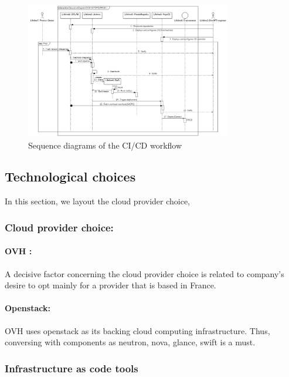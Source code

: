 \begin{figure}[!ht]\centering
\includegraphics[width=0.8\textwidth,angle=00]{assets/f6.jpg}
\caption{Sequence diagrams of the CI/CD workflow}
\label{fig:f6}
\end{figure}


\newpage
\subsection{Technological choices }
In this section, we layout the cloud provider choice,
\subsubsection{Cloud provider choice: } 

\paragraph{OVH : }

A decisive factor concerning the cloud provider choice is related to company’s desire to opt mainly for a provider that is based in France.  

\paragraph{Openstack: }

OVH uses openstack as its backing cloud computing infrastructure. Thus, conversing with components as neutron, nova, glance, swift is a must. 

\subsubsection{Infrastructure as code tools }


